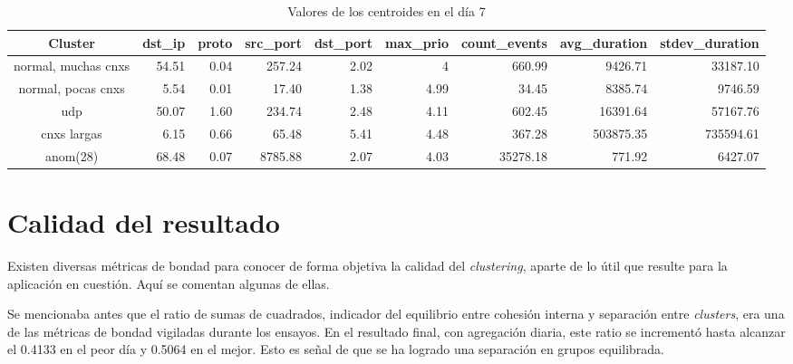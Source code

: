 \begin{table}[h!]
    \begingroup
    \setlength{\tabcolsep}{2pt} %
    \hspace*{-3cm}
    \begin{tabular}{|c|r|r|r|r|r|r|r|r|}
    \hline
    \textbf{Cluster}    & \textbf{dst\_ip} & \textbf{proto} & \textbf{src\_port} & \textbf{dst\_port} & \textbf{max\_prio} & \textbf{count\_events} & \textbf{avg\_duration} & \textbf{stdev\_duration} \\ \hline
    normal, muchas cnxs & 54.51            & 0.04           & 257.24             & 2.02               & 4                  & 660.99                 & 9426.71                & 33187.10                 \\ \hline
    normal, pocas cnxs  & 5.54             & 0.01           & 17.40              & 1.38               & 4.99               & 34.45                  & 8385.74                & 9746.59                  \\ \hline
    udp                 & 50.07            & 1.60           & 234.74             & 2.48               & 4.11               & 602.45                 & 16391.64               & 57167.76                 \\ \hline
    cnxs largas         & 6.15             & 0.66           & 65.48              & 5.41               & 4.48               & 367.28                 & 503875.35              & 735594.61                \\ \hline
    anom(28)            & 68.48            & 0.07           & 8785.88            & 2.07               & 4.03               & 35278.18               & 771.92                 & 6427.07                  \\ \hline
    \end{tabular}
    \endgroup
\caption{Valores de los centroides en el día 7}
\label{tab:dia7}
\end{table}

\section{Calidad del resultado}\label{sec:calidadresultado}

Existen diversas métricas de bondad para conocer de forma objetiva la calidad del \emph{clustering}, aparte de lo útil que resulte para la aplicación en cuestión.
Aquí se comentan algunas de ellas.

Se mencionaba antes que el ratio de sumas de cuadrados, indicador del equilibrio entre cohesión interna y separación entre \emph{clusters}, era una de las métricas de bondad vigiladas durante los ensayos.
En el resultado final, con agregación diaria, este ratio se incrementó hasta alcanzar el 0.4133 en el peor día y 0.5064 en el mejor.
Esto es señal de que se ha logrado una separación en grupos equilibrada.

